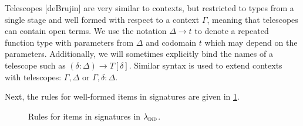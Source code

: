 Telescopes [deBrujin] are very similar to contexts, but restricted to types from a single stage and
well formed with respect to a context $\Gamma$, meaning that telescopes can
contain open terms. We use the notation $\Delta \to t$ to denote a repeated
function type with parameters from $\Delta$ and codomain $t$ which may depend
on the parameters. Additionally, we will sometimes explicitly bind the names of
a telescope such as $(\delta : \Delta) \to T[\delta]$. Similar syntax is used
to extend contexts with telescopes: $\Gamma, \Delta$ or $\Gamma, \delta :
  \Delta$.

Next, the rules for well-formed items in signatures are given in
\cref{fig:lambdaind-item-rules}. 

\begin{figure}[h]
  \caption{Rules for items in signatures in $\lambda_{\textsc{ind}}$.}
  \label{fig:lambdaind-item-rules}
\end{figure}

